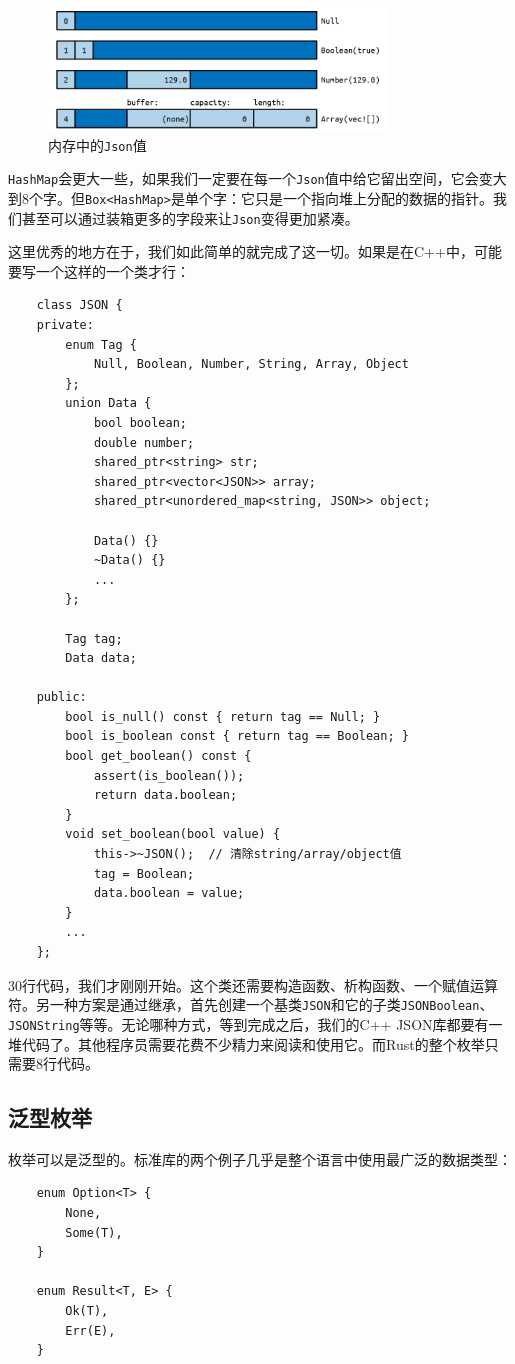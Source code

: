 \begin{figure}[htbp]
    \centering
    \includegraphics[width=0.8\textwidth]{../img/f10-2.png}
    \caption{内存中的\texttt{Json}值}
    \label{f10-2}
\end{figure}

\texttt{HashMap}会更大一些，如果我们一定要在每一个\texttt{Json}值中给它留出空间，它会变大到8个字。但\texttt{Box<HashMap>}是单个字：它只是一个指向堆上分配的数据的指针。我们甚至可以通过装箱更多的字段来让\texttt{Json}变得更加紧凑。

这里优秀的地方在于，我们如此简单的就完成了这一切。如果是在C++中，可能要写一个这样的一个类才行：
\begin{verbatim}
    class JSON {
    private:
        enum Tag {
            Null, Boolean, Number, String, Array, Object
        };
        union Data {
            bool boolean;
            double number;
            shared_ptr<string> str;
            shared_ptr<vector<JSON>> array;
            shared_ptr<unordered_map<string, JSON>> object;

            Data() {}
            ~Data() {}
            ...
        };
        
        Tag tag;
        Data data;
    
    public:
        bool is_null() const { return tag == Null; }
        bool is_boolean const { return tag == Boolean; }
        bool get_boolean() const {
            assert(is_boolean());
            return data.boolean;
        }
        void set_boolean(bool value) {
            this->~JSON();  // 清除string/array/object值
            tag = Boolean;
            data.boolean = value;
        }
        ...
    };
\end{verbatim}

30行代码，我们才刚刚开始。这个类还需要构造函数、析构函数、一个赋值运算符。另一种方案是通过继承，首先创建一个基类\texttt{JSON}和它的子类\texttt{JSONBoolean}、\texttt{JSONString}等等。无论哪种方式，等到完成之后，我们的C++ JSON库都要有一堆代码了。其他程序员需要花费不少精力来阅读和使用它。而Rust的整个枚举只需要8行代码。

\subsection{泛型枚举}\label{GenEnum}
枚举可以是泛型的。标准库的两个例子几乎是整个语言中使用最广泛的数据类型：
\begin{verbatim}
    enum Option<T> {
        None,
        Some(T),
    }

    enum Result<T, E> {
        Ok(T),
        Err(E),
    }
\end{verbatim}

